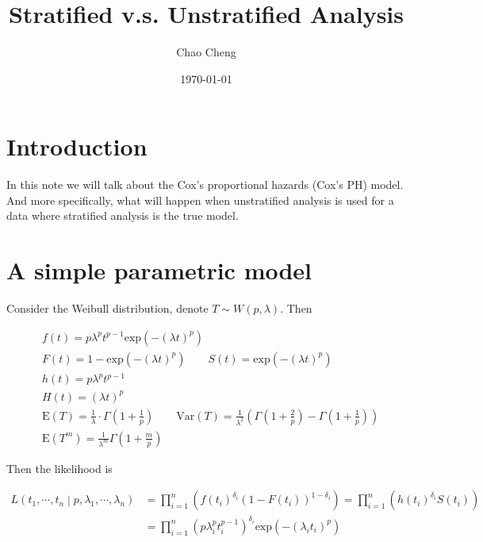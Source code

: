 \documentclass[a4paper,12pt]{article}
\title{Stratified v.s. Unstratified Analysis}
\author{Chao Cheng}
\date{\today}
\begin{document}
\maketitle
\tableofcontents{}

\section{Introduction}
\label{sec:introduction}

In this note we will talk about the Cox's proportional hazards (Cox's PH) model. And more specifically, what will happen when unstratified analysis is used for a data where stratified analysis is the true model. 

\section{A simple parametric model}
\label{sec:simple-param-model}

Consider the Weibull distribution, denote $T \sim W(p, \lambda)$. Then

\[
  \begin{aligned}
    & f\left(t\right) = p\lambda^pt^{p - 1}\mathrm{exp}\left(-\left(\lambda t\right)^p\right)    \\
    & F\left(t\right) = 1 - \mathrm{exp}\left(-\left(\lambda t\right)^p\right)
      \quad\quad S\left(t\right) = \mathrm{exp}\left(-\left(\lambda t\right)^p\right)    \\
    & h\left(t\right) = p\lambda^pt^{p - 1}    \\
    & H\left(t\right) = \left(\lambda t\right)^p    \\
    & \mathrm{E}\left(T\right) = \frac{1}{\lambda} \cdot \Gamma\left(1 + \frac{1}{p}\right)
      \quad\quad \mathrm{Var}\left(T\right) = \frac{1}{\lambda^2}\left(
      \Gamma\left(1 + \frac{2}{p}\right)
      - \Gamma\left(1 + \frac{1}{p}\right)
      \right)    \\
    & \mathrm{E}\left(T^m\right) = \frac{1}{\lambda^m}\Gamma\left(1 + \frac{m}{p}\right)
  \end{aligned}
\]

Then the likelihood is

\begin{equation}
  \label{eq:weibull_likelihood}
  \begin{aligned}
    L\left(t_1, \cdots, t_n\middle|p, \lambda_1, \cdots, \lambda_n\right)
    &= \prod\limits_{i = 1}^n\left(
    f(t_i)^{\delta_i}\left(1 - F\left(t_i\right)\right)^{1 - \delta_i}
    \right)
    = \prod\limits_{i = 1}^n\left(
    h\left(t_i\right)^{\delta_i}S\left(t_i\right)
    \right)    \\
    &= \prod\limits_{i = 1}^n
      \left(p\lambda_i^{p}t_i^{p - 1}\right)^{\delta_i}
      \mathrm{exp}\left(-\left(\lambda_i t_i\right)^p\right)
  \end{aligned}
\end{equation}
\end{document}
